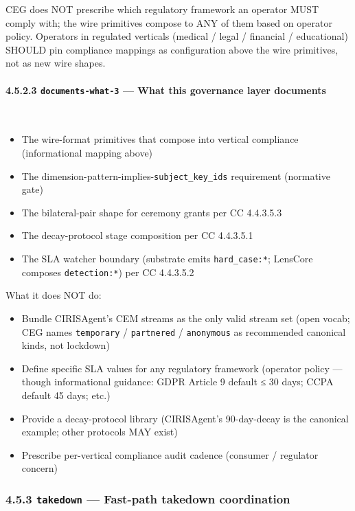 \documentclass[11pt]{article}
\begin{document}
CEG does NOT prescribe which regulatory framework an operator MUST comply with; the wire primitives compose to ANY of them based on operator policy. Operators in regulated verticals (medical / legal / financial / educational) SHOULD pin compliance mappings as configuration above the wire primitives, not as new wire shapes.


\paragraph{4.5.2.3 \texttt{documents-what-3} — What this governance layer documents}\mbox{}\\


\begin{itemize}\setlength\itemsep{0pt}
\item The wire-format primitives that compose into vertical compliance (informational mapping above)
\item The dimension-pattern-implies-\texttt{subject\_key\_ids} requirement (normative gate)
\item The bilateral-pair shape for ceremony grants per CC 4.4.3.5.3
\item The decay-protocol stage composition per CC 4.4.3.5.1
\item The SLA watcher boundary (substrate emits \texttt{hard\_case:*}; LensCore composes \texttt{detection:*}) per CC 4.4.3.5.2
\end{itemize}


What it does NOT do:

\begin{itemize}\setlength\itemsep{0pt}
\item Bundle CIRISAgent's CEM streams as the only valid stream set (open vocab; CEG names \texttt{temporary} / \texttt{partnered} / \texttt{anonymous} as recommended canonical kinds, not lockdown)
\item Define specific SLA values for any regulatory framework (operator policy — though informational guidance: GDPR Article 9 default ≤ 30 days; CCPA default 45 days; etc.)
\item Provide a decay-protocol library (CIRISAgent's 90-day-decay is the canonical example; other protocols MAY exist)
\item Prescribe per-vertical compliance audit cadence (consumer / regulator concern)
\end{itemize}


\subsubsection*{4.5.3 \texttt{takedown} — Fast-path takedown coordination}
\end{document}
